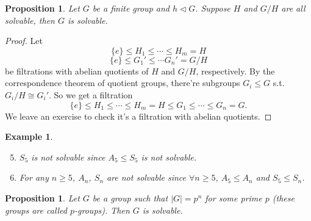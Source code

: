 \documentclass[11pt]{book}
\newtheorem{example}[theorem]{Example}
\newtheorem{proposition}[theorem]{Proposition}
\begin{document}
\begin{proposition}\label{prop-subgroupQuotientSolvableImpliesSolvable}
    Let $G$ be a finite group and $h\lhd G$. Suppose $H$ and $G /H$ are all solvable, then $G$ is solvable. 
\end{proposition}

\begin{proof}
    Let 
    \[
    \{e\}\leq H_{1}\leq \cdots \leq H_{m}=H
    \]
    \[\{e\}\leq G_{1}'\leq \cdots G_{n}'=G /H\]
    be filtrations with abelian quotients of $H$ and $G/ H$, respectively. By the correspondence theorem of quotient groups, there're subgroups $G_{i}\leq G$ s.t. $G_{i}/H \cong G_{i}'$. So we get a filtration
    \[
    \{e\}\leq H_{1}\leq \cdots \leq H_{m}=H\leq G_{1}\leq \cdots\leq G_{n}=G.
    \]
    We leave an exercise to check it's a filtration with abelian quotients. 
\end{proof}

\begin{example}
    \begin{enumerate}\setcounter{enumi}{4}
        \item $S_{5}$ is not solvable since $A_{5}\leq S_{5}$ is not solvable. 
        \item For any $n\geq 5$, $A_{n}$, $S_{n}$ are not solvable since $\forall n\geq 5$, $A_{5}\leq A_{n}$ and $S_{5}\leq S_{n}$. 
    \end{enumerate}
\end{example}

\begin{proposition}
    Let $G$ be a group such that $\left| G \right| =p^{n}$ for some prime $p$ (these groups are called $p$-groups). Then $G$ is solvable. 
\end{proposition}
\end{document}
